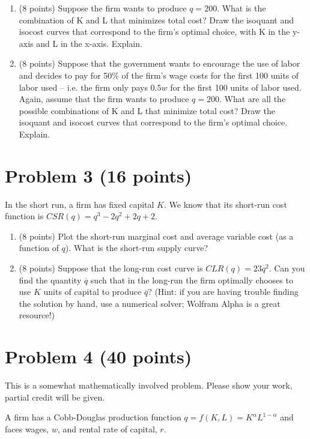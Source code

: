 \documentclass{article}
\begin{document}
\begin{enumerate}
\item (8 points) Suppose the firm wants to produce $q = 200$. What is the combination of K and L that minimizes total cost? Draw the isoquant and isocost curves that correspond to the firm’s optimal choice, with K in the y-axis and L in the x-axis. Explain.
\item (8 points) Suppose that the government wants to encourage the use of labor and decides to pay for 50\% of the firm’s wage costs for the first 100 units of labor used – i.e. the firm only pays $0.5w$ for the first 100 units of labor used. Again, assume that the firm wants to produce $q = 200$. What are all the possible combinations of K and L that minimize total cost? Draw the isoquant and isocost curves that correspond to the firm’s optimal choice. Explain.
\end{enumerate}

\section*{Problem 3 (16 points)}

In the short run, a firm has fixed capital $K$. We know that its short-run cost function is $CSR (q) = q^3 - 2q^2 + 2q + 2$.

\begin{enumerate}
\item (8 points) Plot the short-run marginal cost and average variable cost (as a function 
of $q$). What is the short-run supply curve?
\item (8 points) Suppose that the long-run cost curve is $CLR (q) = 23 q^2$. Can you find 
the quantity $\overline{q}$ such that in the long-run the firm optimally chooses to use $K$ units 
of capital to produce $\overline{q}$? (Hint: if you are having trouble finding the solution by 
hand, use a numerical solver; Wolfram Alpha is a great resource!)
\end{enumerate}

\newpage

\section*{Problem 4 (40 points)}

This is a somewhat mathematically involved problem. Please show your work, partial credit will be given.

A firm has a Cobb-Douglas production function $q = f(K, L) = K^\alpha L^{1-\alpha}$ and faces wages, $w$, and rental rate of capital, $r$.
\end{document}
